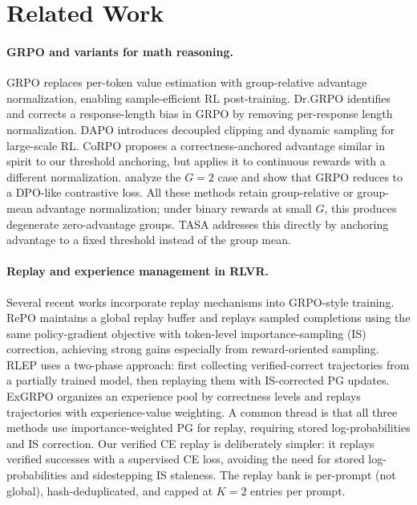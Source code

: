 \section{Related Work}
\label{sec:related}

\paragraph{GRPO and variants for math reasoning.}
GRPO \citep{shao2024deepseekmath} replaces per-token value estimation with group-relative advantage normalization, enabling sample-efficient RL post-training.
Dr.GRPO \citep{liu2025understanding} identifies and corrects a response-length bias in GRPO by removing per-response length normalization.
DAPO \citep{yu2025dapo} introduces decoupled clipping and dynamic sampling for large-scale RL.
CoRPO \citep{tang2025corpo} proposes a correctness-anchored advantage similar in spirit to our threshold anchoring, but applies it to continuous rewards with a different normalization.
\citet{chen2025ittakestwo} analyze the $G{=}2$ case and show that GRPO reduces to a DPO-like contrastive loss.
All these methods retain group-relative or group-mean advantage normalization; under binary rewards at small $G$, this produces degenerate zero-advantage groups.
TASA addresses this directly by anchoring advantage to a fixed threshold instead of the group mean.

\paragraph{Replay and experience management in RLVR.}
Several recent works incorporate replay mechanisms into GRPO-style training.
RePO \citep{li2025repo} maintains a global replay buffer and replays sampled completions using the same policy-gradient objective with token-level importance-sampling (IS) correction, achieving strong gains especially from reward-oriented sampling.
RLEP \citep{zhang2025rlep} uses a two-phase approach: first collecting verified-correct trajectories from a partially trained model, then replaying them with IS-corrected PG updates.
ExGRPO \citep{exgrpo2025} organizes an experience pool by correctness levels and replays trajectories with experience-value weighting.
A common thread is that all three methods use importance-weighted PG for replay, requiring stored log-probabilities and IS correction.
Our verified CE replay is deliberately simpler: it replays verified successes with a supervised CE loss, avoiding the need for stored log-probabilities and sidestepping IS staleness.
The replay bank is per-prompt (not global), hash-deduplicated, and capped at $K{=}2$ entries per prompt.

